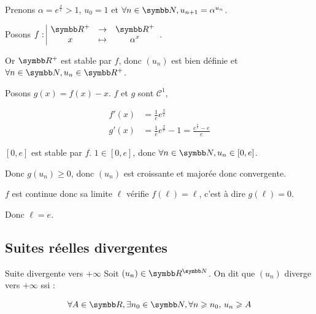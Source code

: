 \begin{exemple}
    Prenons $\alpha = e^{\frac x e} > 1$, $u_0 = 1$ et $\forall n \in \N, u_{n + 1} = \alpha^{u_n}$.

    Posons $\fonction{f}{\R^+}{\R^+}{x}{\alpha^x}$.

    Or $\R^+$ est stable par $f$, donc $(u_n)$ est bien définie et $\forall n \in \N, u_n \in \R^+$.

    Posons $g(x) = f(x) - x$. 
    $f$ et $g$ sont $\mathscr C^1$, 

    \begin{align*}
        f'(x) &=  \frac 1 e e^{\frac x e} \\
        g'(x) &=  \frac 1 e e^{\frac x e} - 1 = \frac{e^{\frac x e} - e}{e}
    \end{align*}


    \begin{center}
    \end{center}

    $[0, e]$ est stable par $f$. $1 \in [0, e]$, donc $\forall n \in \N, u_n \in [0, e]$.

    Donc $g(u_n) \geqslant 0$, donc $(u_n)$ est croissante et majorée donc convergente. 

    $f$ est continue donc sa limite $\ell$ vérifie $f(\ell) = \ell$, c'est à dire 
    $g(\ell) = 0$.

    Donc $\ell = e$.
\end{exemple}

\subsection{Suites réelles divergentes}
\begin{definition}{Suite divergente vers $+\infty$}{}
    Soit $(u_n) \in \R^{\N}$. On dit que $(u_n)$ diverge vers $+\infty$ ssi : 

    \[\forall A \in \R, \exists n_0 \in \N, \forall n \geqslant n_0, \, u_n \geqslant A\]
\end{definition}

